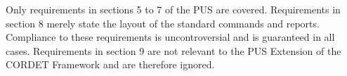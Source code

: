 \documentclass{pnp_article}
\begin{document}
Only requirements in sections 5 to 7 of the PUS are covered. Requirements in section 8 merely state the layout of the standard commands and reports. Compliance to these requirements is uncontroversial and is guaranteed in all cases. Requirements in section 9 are not relevant to the PUS Extension of the CORDET Framework and are therefore ignored.

\begin{landscape} 



\end{landscape}
\end{document}
